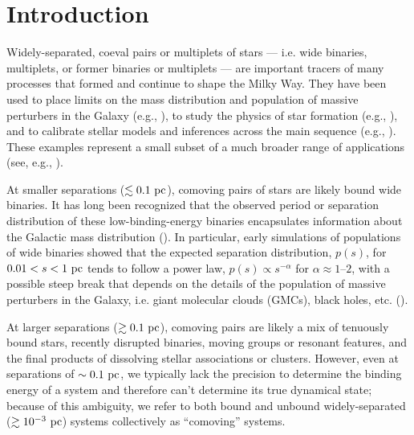 \documentclass[modern, letterpaper]{aastex61}
\begin{document}

\section{Introduction}\label{sec:introduction}

Widely-separated, coeval pairs or multiplets of stars --- i.e. wide binaries,
multiplets, or former binaries or multiplets --- are important tracers of many
processes that formed and continue to shape the Milky Way.
They have been used to place limits on the mass distribution and population of
massive perturbers in the Galaxy (e.g., \citealt{Yoo:2004}), to study the
physics of star formation (e.g., \citealt{Parker:2009,Reipurth:2012}),
and to calibrate stellar models and inferences across the main sequence (e.g.,
\citealt{Brewer:2016}).
These examples represent a small subset of a much broader range of applications
(see, e.g., \citealt{Chaname:2007}).

At smaller separations ($\lesssim 0.1~\mathrm{pc}$), comoving pairs of stars are likely
bound wide binaries.
It has long been recognized that the observed period or separation distribution
of these low-binding-energy binaries encapsulates information about the
Galactic mass distribution (\citealt{Opik:1924,Oort:1950,Bahcall:1985}).
In particular, early simulations of populations of wide binaries showed that
the expected separation distribution, $p(s)$, for $0.01 < s < 1~\mathrm{pc}$ tends to
follow a power law, $p(s) \propto s^{-\alpha}$ for $\alpha \approx 1$--$2$,
with a possible steep break that depends on the details of the population of
massive perturbers in the Galaxy, i.e. giant molecular clouds (GMCs), black
holes, etc. (\citealt{Weinberg:1987}).

At larger separations ($\gtrsim 0.1~\mathrm{pc}$), comoving pairs are likely a mix of
tenuously bound stars, recently disrupted binaries, moving groups or resonant
features, and the final products of dissolving stellar associations or
clusters.
However, even at separations of $\sim 0.1~\mathrm{pc}$, we typically lack the precision
to determine the binding energy of a system and therefore can't determine its
true dynamical state; because of this ambiguity, we refer to both bound and
unbound widely-separated ($\gtrsim 10^{-3}~\mathrm{pc}$) systems collectively as
``comoving'' systems.
\end{document}
